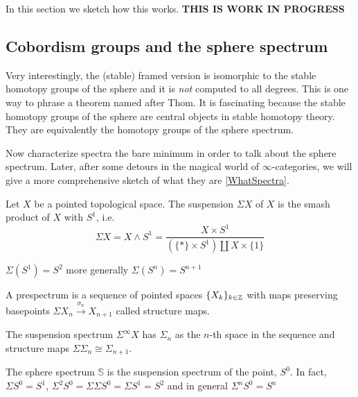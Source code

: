 In this section we sketch how this works. \warning \textbf{THIS IS WORK IN PROGRESS}
 \subsection{Cobordism groups and the sphere spectrum \extra}\label{homotopyCob}
Very interestingly, the (stable) framed version is isomorphic to the stable homotopy groups of the sphere and it is \textit{not} computed to all degrees. This is one way to phrase a theorem named after Thom. It is fascinating because the stable homotopy groups of the sphere are central objects in stable homotopy theory. They are equivalently the homotopy groups of the sphere spectrum.

Now characterize spectra the bare minimum in order to talk about the sphere spectrum. Later,
after some detours in the magical world of $\infty$-categories, we will 
give a more comprehensive sketch of what they are \ref{WhatSpectra}.
\begin{defn}[Suspension]
    Let $X$ be a pointed topological space. The suspension $\Sigma X$ of $X$ is the smash product of $X$
     with $S^1$, i.e.
    $$\Sigma X=X\land S^1=\frac{X\times S^1}{(\{\ast\}\times S^1)\amalg X\times \{1\}}$$
\end{defn}
\begin{ex}
$\Sigma(S^1)=S^2$ more generally $\Sigma(S^n)=S^{n+1}$
\end{ex}
\begin{defn}
    A prespectrum is a sequence of pointed spaces $\{X_k\}_{k\in\mathbb{Z}}$ with maps preserving basepoints
     $\Sigma X_n\xrightarrow{\sigma_n}X_{n+1}$ called structure maps.
\end{defn}
\begin{defn}
    The suspension spectrum $\Sigma^\infty X$ has $\Sigma_n$ as the $n$-th space in the sequence and structure maps $\Sigma\Sigma_n\cong\Sigma_{n+1}$.
\end{defn}
\begin{ex}
    The sphere spectrum $\mathds{S}$ is the suspension spectrum of the point, $S^0$. In fact, $\Sigma S^0=S^1$, $\Sigma^2 S^0=\Sigma\Sigma S^0=\Sigma S^1=S^2$ and in general $\Sigma^n S^0=S^n $
\end{ex}

